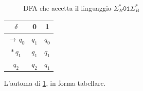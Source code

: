 \begin{figure}[ht!]

\caption{DFA che accetta il linguaggio $\Sigma_{B}^{*}\mathtt{01}\Sigma_{B}^{*}$}
\label{fig:dfa-sottostringa-01}\end{figure}

\begin{margintable}
	\begin{center}
		\begin{tabular}{c|c|c}
			$\delta$   & 0     & 1     \\
			\hline
			$\to\,q_0$ & $q_1$ & $q_0$ \\
			\hline
			$*\,q_1$   & $q_1$ & $q_1$ \\
			\hline
			$q_2$      & $q_2$ & $q_1$
		\end{tabular}
	\end{center}
\caption{L'automa di \cref{fig:dfa-sottostringa-01}, in forma tabellare.}
\end{margintable}



